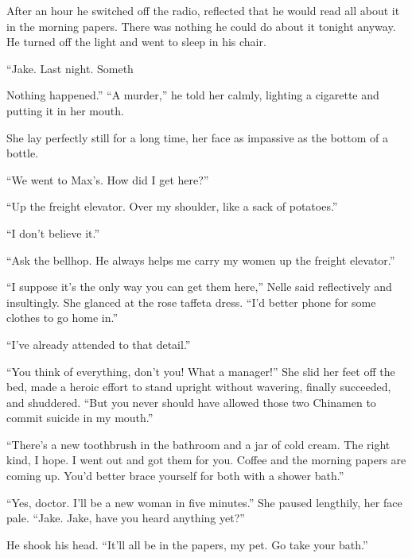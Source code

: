 \documentclass{novel}
\begin{document}
After an hour he switched off the radio, reflected that he would read all about it in the morning papers. There was nothing he could do about it tonight anyway. He turned off the light and went to sleep in his chair.

\begin{ChapterStart}
\vspace{3\nbs}
\end{ChapterStart}

“Jake. Last night. Someth

Nothing happened.” “A murder,” he told her calmly, lighting a cigarette and putting it in her mouth.

She lay perfectly still for a long time, her face as impassive as the bottom of a bottle.

“We went to Max’s. How did I get here?”

“Up the freight elevator. Over my shoulder, like a sack of potatoes.”

“I don’t believe it.”

“Ask the bellhop. He always helps me carry my women up the freight elevator.”

“I suppose it’s the only way you can get them here,” Nelle said reflectively and insultingly. She glanced at the rose taffeta dress. “I’d better phone for some clothes to go home in.”

“I’ve already attended to that detail.”

“You think of everything, don’t you! What a manager!” She slid her feet off the bed, made a heroic effort to stand upright without wavering, finally succeeded, and shuddered. “But you never should have allowed those two Chinamen to commit suicide in my mouth.”

“There’s a new toothbrush in the bathroom and a jar of cold cream. The right kind, I hope. I went out and got them for you. Coffee and the morning papers are coming up. You’d better brace yourself for both with a shower bath.”

“Yes, doctor. I’ll be a new woman in five minutes.” She paused lengthily, her face pale. “Jake. Jake, have you heard anything yet?”

He shook his head. “It’ll all be in the papers, my pet. Go take your bath.”
\end{document}
